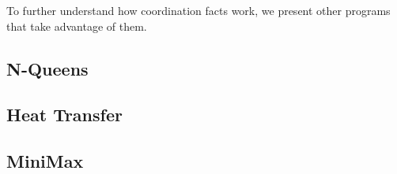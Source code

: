 To further understand how coordination facts work, we present other programs that
take advantage of them.

\subsection{N-Queens}\label{section:coord:nqueens}


\subsection{Heat Transfer}\label{section:coord:ht}


\subsection{MiniMax}\label{section:coord:minimax}


